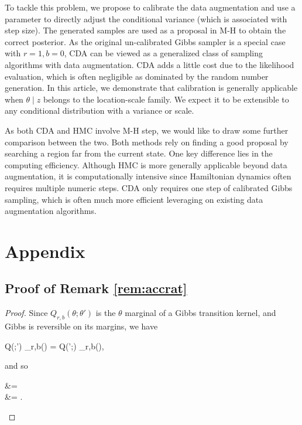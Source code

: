\documentclass[11pt]{article}
\newcommand{\be}{\begin{equs}}
\newcommand{\ee}{\end{equs}}
\begin{document}
To tackle this problem, we propose to calibrate the data augmentation and use a parameter to directly adjust the conditional variance (which is associated with step size). The generated samples are used as a proposal in  M-H to obtain the correct posterior. As the original un-calibrated Gibbs sampler is a special case with $r=1, b=0$, CDA can be viewed as a generalized class of sampling algorithms with data augmentation. CDA adds a little cost due to the likelihood evaluation, which is often negligible as dominated by the random number generation. In this article, we demonstrate that calibration is generally applicable when $\theta \mid z$ belongs to the location-scale family. We expect it to be extensible to any conditional distribution with a variance or scale.

As both CDA and HMC involve M-H step, we would like to draw some further comparison between the two. Both methods rely on finding a good proposal by searching a region far from the current state. One key difference lies in the computing efficiency. Although HMC is more generally applicable beyond data augmentation, it is computationally intensive since Hamiltonian dynamics often requires multiple numeric steps. CDA only requires one step of calibrated Gibbs sampling, which is often much more efficient leveraging on existing data augmentation algorithms.



\appendix
\section{Appendix}

\subsection{Proof of Remark \ref{rem:accrat}}
\begin{proof}
Since $Q_{r,b}(\theta;\theta')$ is the $\theta$ marginal of a Gibbs transition kernel, and Gibbs is reversible on its margins, we have
\be
Q(\theta;\theta') \Pi_{r,b}(\theta) = Q(\theta';\theta) \Pi_{r,b}(\theta),
\ee 
and so
\be
{} &=  \\
&= .
\ee
\end{proof}
\end{document}
